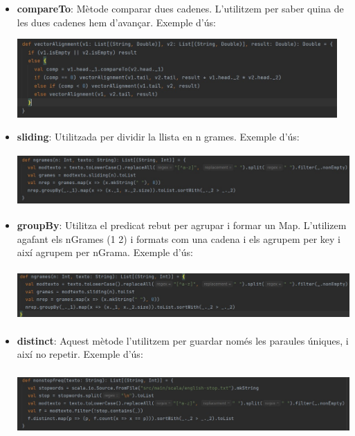 \documentclass[11pt,a4paper]{article}
\begin{document}
\begin{itemize}
			\item \textbf{compareTo}: Mètode comparar dues cadenes. L'utilitzem per saber quina de les dues cadenes hem d'avançar. Exemple d'ús:
				\begin{center}
					\includegraphics[height=3cm]{captures/primeraPart/ordreSuperior/compareTo.jpg}
				\end{center}
				
			\item \textbf{sliding}: Utilitzada per dividir la llista en n grames. Exemple d'ús:
				\begin{center}
					\includegraphics[height=2cm]{captures/primeraPart/ordreSuperior/sliding.jpg}
				\end{center}
				
			\item \textbf{groupBy}: Utilitza el predicat rebut per agrupar i formar un Map. L'utilizem agafant els nGrames (1 2) i formats com una cadena i els agrupem per key i així agrupem per nGrama. Exemple d'ús:
				\begin{center}
					\includegraphics[height=2cm]{captures/primeraPart/ordreSuperior/groupBy.jpg}
				\end{center}
				
			\item \textbf{distinct}: Aquest mètode l'utilitzem per guardar només les paraules úniques, i així no repetir. Exemple d'ús:
				\begin{center}
					\includegraphics[height=2.5cm]{captures/primeraPart/ordreSuperior/distinct.jpg}
				\end{center}
		\end{itemize}
		
\end{document}
